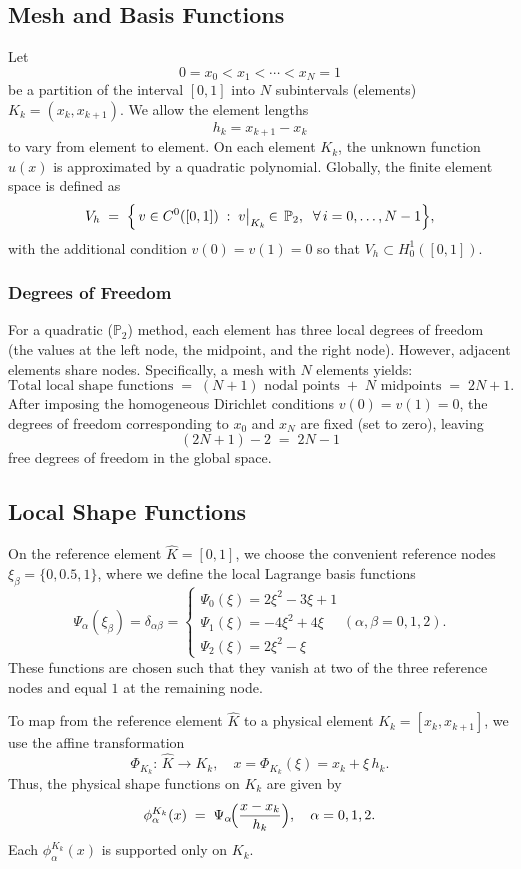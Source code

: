 \documentclass[a4paper,10pt]{article}
\begin{document}
\subsection{Mesh and Basis Functions}
Let
\[
	0 = x_0 < x_1 < \cdots < x_N = 1
\]
be a partition of the interval $[0,1]$ into $N$ subintervals (elements) $K_k = (x_k, x_{k+1})$. We allow the element lengths
\[
	h_k = x_{k+1} - x_k
\]
to vary from element to element. On each element $K_k$, the unknown function $u(x)$ is approximated by a quadratic polynomial. Globally, the finite element space is defined as
\[
	V_h \;=\; \Bigl\{\,v \in C^{0}([0,1])\;:\; v\bigl|_{K_k} \,\in\, \mathbb{P}_2,\;\; \forall\, i=0,\dots,N-1 \Bigr\},
\]
with the additional condition \(v(0)=v(1)=0\) so that \(V_h \subset H^1_0([0,1])\).
\subsubsection{Degrees of Freedom}
For a quadratic ($\mathbb{P}_2$) method, each element has three local degrees of freedom (the values at the left node, the midpoint, and the right node). However, adjacent elements share nodes. Specifically, a mesh with $N$ elements yields:
\[
	\text{Total local shape functions} \;=\; (N+1) \text{ nodal points} \;+\; N \text{ midpoints} \;=\; 2N+1.
\]
After imposing the homogeneous Dirichlet conditions $v(0)=v(1)=0$, the degrees of freedom corresponding to $x_0$ and $x_N$ are fixed (set to zero), leaving
\[
	(2N+1)-2 \;=\; 2N-1
\]
free degrees of freedom in the global space.

\subsection{Local Shape Functions}
On the reference element $\widehat{K}=[0,1]$, we choose the convenient reference nodes \(\xi_\beta=\{0,0.5,1\}\), where we define the local Lagrange basis functions
\[
	\Psi_{\alpha}(\xi_{\beta})
	= \delta_{\alpha\beta} =
	\begin{cases}
		\Psi_0(\xi) = 2\xi^2-3\xi+1 \\
		\Psi_1(\xi) = -4\xi^2+4\xi  \\
		\Psi_2(\xi) = 2\xi^2-\xi
	\end{cases} (\alpha,\beta=0,1,2).
\]
These functions are chosen such that they vanish at two of the three reference nodes and equal $1$ at the remaining node.

To map from the reference element $\widehat{K}$ to a physical element $K_k=[x_k,x_{k+1}]$, we use the affine transformation
\[
	\Phi_{K_k}:\,\widehat{K}\to K_k,\quad x=\Phi_{K_k}(\xi)=x_k+\xi\,h_k.
\]
Thus, the physical shape functions on $K_k$ are given by
\[
	\phi_{\alpha}^{K_k}(x) \;=\; \Psi_{\alpha}\!\Bigl(\frac{x-x_k}{h_k}\Bigr),\quad \alpha=0,1,2.
\]
Each $\phi_{\alpha}^{K_k}(x)$ is supported only on $K_k$.
\end{document}
